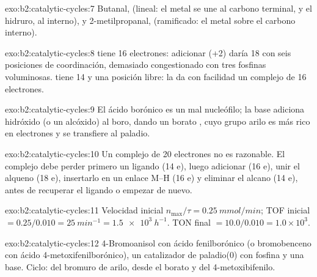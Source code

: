 \begin{solution}{exo:b2:catalytic-cycles:7}
Butanal,  (lineal: el metal se une al carbono terminal, y el hidruro,
al interno), y 2-metilpropanal,  (ramificado: el metal sobre el carbono
interno).
\end{solution}

\begin{solution}{exo:b2:catalytic-cycles:8}
 tiene 16 electrones: adicionar  (+2) daría 18 con seis
posiciones de coordinación, demasiado congestionado con tres fosfinas voluminosas.  tiene 14
y una posición libre: la  da con facilidad un complejo de 16 electrones.
\end{solution}

\begin{solution}{exo:b2:catalytic-cycles:9}
El ácido borónico es un mal nucleófilo; la base adiciona hidróxido (o un alcóxido) al boro,
dando un borato , cuyo grupo arilo es más rico en electrones y se transfiere al
paladio.
\end{solution}

\begin{solution}{exo:b2:catalytic-cycles:10}
Un complejo de 20 electrones no es razonable. El complejo debe perder primero un ligando (14 e), luego
adicionar  (16 e), unir el alqueno (18 e), insertarlo en un enlace M--H (16 e) y eliminar el
alcano (14 e), antes de recuperar el ligando o empezar de nuevo.
\end{solution}

\begin{solution}{exo:b2:catalytic-cycles:11}
Velocidad inicial $n_{\max}/\tau = \qty{0.25}{mmol/min}$; TOF inicial $= 0.25/0.010 =
\qty{25}{min^{-1}} = \qty{1.5e3}{h^{-1}}$. TON final $= 10.0/0.010 = 1.0 \times 10^3$.
\end{solution}

\begin{solution}{exo:b2:catalytic-cycles:12}
4-Bromoanisol con ácido fenilborónico (o bromobenceno con ácido 4-metoxifenilborónico),
un catalizador de paladio(0) con fosfina y una base. Ciclo:  del
bromuro de arilo,  desde el borato y  del
4-metoxibifenilo.
\end{solution}

